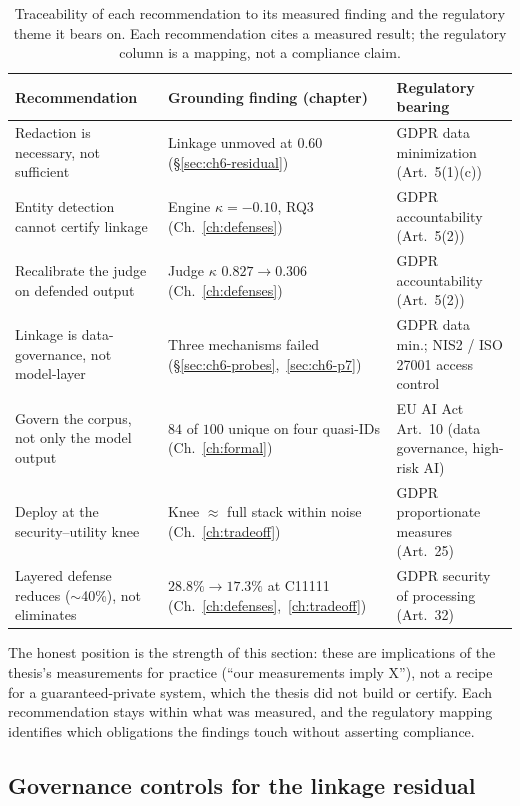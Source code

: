 \documentclass[11pt,a4paper]{report}
\begin{document}
\begin{table}[h]
\centering
\caption[Traceability of recommendations to findings and regulatory themes]{Traceability of each recommendation to its measured finding and the regulatory theme it bears on.
Each recommendation cites a measured result; the regulatory column is a mapping, not a compliance claim.}
\label{tab:disc-recommendations}
\begin{tabularx}{\textwidth}{LLL}
\toprule
\textbf{Recommendation} & \textbf{Grounding finding (chapter)} & \textbf{Regulatory bearing}\\
\midrule
Redaction is necessary, not sufficient & Linkage unmoved at $0.60$ (\S\ref{sec:ch6-residual}) & GDPR data minimization (Art.\ 5(1)(c))\\
\midrule
Entity detection cannot certify linkage & Engine $\kappa=-0.10$, RQ3 (Ch.~\ref{ch:defenses}) & GDPR accountability (Art.\ 5(2))\\
\midrule
Recalibrate the judge on defended output & Judge $\kappa$ $0.827\!\to\!0.306$ (Ch.~\ref{ch:defenses}) & GDPR accountability (Art.\ 5(2))\\
\midrule
Linkage is data-governance, not model-layer & Three mechanisms failed (\S\ref{sec:ch6-probes},~\ref{sec:ch6-p7}) & GDPR data min.; NIS2 / ISO 27001 access control\\
\midrule
Govern the corpus, not only the model output & $84$ of $100$ unique on four quasi-IDs (Ch.~\ref{ch:formal}) & EU AI Act Art.~10 (data governance, high-risk AI)\\
\midrule
Deploy at the security--utility knee & Knee $\approx$ full stack within noise (Ch.~\ref{ch:tradeoff}) & GDPR proportionate measures (Art.\ 25)\\
\midrule
Layered defense reduces ($\sim$40\%), not eliminates & $28.8\%\!\to\!17.3\%$ at C11111 (Ch.~\ref{ch:defenses},~\ref{ch:tradeoff}) & GDPR security of processing (Art.\ 32)\\
\bottomrule
\end{tabularx}
\end{table}

The honest position is the strength of this section: these are implications of the thesis's measurements
for practice (``our measurements imply X''), not a recipe for a guaranteed-private system, which the
thesis did not build or certify. Each recommendation stays within what was measured, and the regulatory
mapping identifies which obligations the findings touch without asserting compliance.

\subsection{Governance controls for the linkage residual}
\label{sec:disc-governance}
\end{document}
